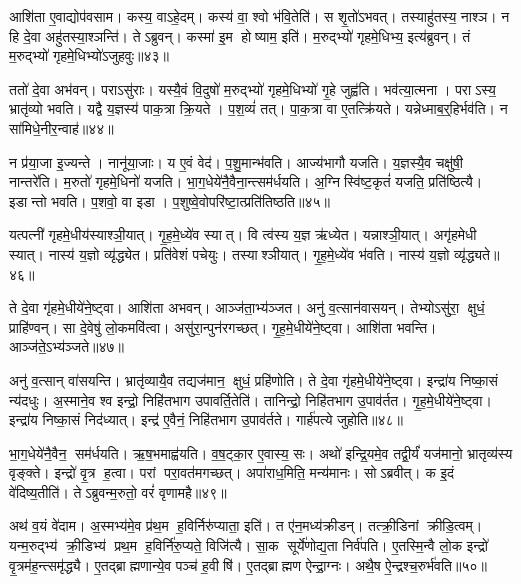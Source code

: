 आशि॑ता ए॒वाद्योप॑वसाम।
कस्य॒ वाऽहे॒दम्।
कस्य॑ वा॒ श्वो भ॑वि॒तेति॑।
स शृ॒तो॑ऽभवत्।
तस्याहु॑तस्य॒ नाश्ञ\sn{}।
न हि दे॒वा अहु॑तस्या॒श्ञन्ति॑।
तेऽब्रुवन्।
कस्मा॑ इ॒म होष्याम॒ इति॑।
म॒रुद्भ्यो॑ गृहमे॒धिभ्य॒ इत्य॑ब्रुवन्।
तं म॒रुद्भ्यो॑ गृहमे॒धिभ्यो॑ऽजुहवुः॥४३॥

ततो॑ दे॒वा अभ॑वन्।
पराऽसु॑राः।
यस्यै॒वं वि॒दुषो॑ म॒रुद्भ्यो॑ गृहमे॒धिभ्यो॑ गृ॒हे जुह्व॑ति।
भव॑त्या॒त्मना।
पराऽस्य॒ भ्रातृ॑व्यो भवति।
यद्वै य॒ज्ञस्य॑ पाक॒त्रा क्रि॒यते।
प॒श॒व्यं॑ तत्।
पा॒क॒त्रा वा ए॒तत्क्रि॑यते।
यन्नेध्माब॒र्॒हिर्भव॑ति।
न सा॑मिधे॒नीर॒न्वाह॑॥४४॥

न प्र॑या॒जा इ॒ज्यन्ते।
नानू॑या॒जाः।
य ए॒वं वेद॑।
प॒शु॒मान्भ॑वति।
आज्य॑भागौ यजति।
य॒ज्ञस्यै॒व चक्षु॑षी॒ नान्तरे॑ति।
म॒रुतो॑ गृहमे॒धिनो॑ यजति।
भा॒ग॒धेये॑नै॒वैना॒न्त्सम॑र्धयति।
अ॒ग्निस्वि॑ष्ट॒कृतं॑ यजति॒ प्रति॑ष्ठित्यै।
इडान्तो भवति।
प॒शवो॒ वा इडा।
प॒शुष्वे॒वोपरि॑ष्टा॒त्प्रति॑तिष्ठति॥४५॥

यत्पत्नी॑ गृहमे॒धीय॑स्याश्ञी॒यात्।
गृ॒ह॒मे॒ध्ये॑व स्यात्।
वि त्व॑स्य य॒ज्ञ ऋ॑ध्येत।
यन्नाश्ञी॒यात्।
अगृ॑हमेधी स्यात्।
नास्य॑ य॒ज्ञो व्यृ॑द्ध्येत।
प्रति॑वेशं पचेयुः।
तस्याश्ञीयात्।
गृ॒ह॒मे॒ध्ये॑व भ॑वति।
नास्य॑ य॒ज्ञो व्यृ॑द्ध्यते॥४६॥

ते दे॒वा गृ॑हमे॒धीये॑ने॒ष्ट्वा।
आशि॑ता अभवन्।
आञ्ज॑ता॒भ्य॑ञ्जत।
अनु॑ व॒त्सान॑वासयन्।
तेभ्योऽसु॑रा॒ क्षुधं॒ प्राहि॑ण्वन्।
सा दे॒वेषु॑ लो॒कमवि॑त्वा।
असु॑रा॒न्पुन॑रगच्छत्।
गृ॒ह॒मे॒धीये॑ने॒ष्ट्वा।
आशि॑ता भवन्ति।
आञ्ज॑ते॒ऽभ्य॑ञ्जते॥४७॥

अनु॑ व॒त्सान् वा॑सयन्ति।
भ्रातृ॑व्यायै॒व तद्यज॑मान॒ क्षुधं॒ प्रहि॑णोति।
ते दे॒वा गृ॑हमे॒धीये॑ने॒ष्ट्वा।
इन्द्रा॑य निष्का॒सं न्य॑दधुः।
अ॒स्माने॒व श्व इन्द्रो॒ निहि॑तभाग उपावर्ति॒तेति॑।
तानिन्द्रो॒ निहि॑तभाग उ॒पाव॑र्तत।
गृ॒ह॒मे॒धीये॑ने॒ष्ट्वा।
इन्द्रा॑य निष्का॒सं निद॑ध्यात्।
इन्द्र॑ ए॒वैनं॒ निहि॑तभाग उ॒पाव॑र्तते।
गार्\mbox{}ह॑पत्ये जुहोति॥४८॥

भा॒ग॒धेये॑नै॒वैन॒ सम॑र्धयति।
ऋ॒ष॒भमाह्व॑यति।
व॒ष॒ट्का॒र ए॒वास्य॒ सः।
अथो॑ इन्द्रि॒यमे॒व तद्वी॒र्यं॑ यज॑मानो॒ भ्रातृव्य॑स्य वृङ्क्ते।
इन्द्रो॑ वृ॒त्र ह॒त्वा।
परां परा॒वत॑मगच्छत्।
अपा॑राध॒मिति॒ मन्य॑मानः।
सोऽब्रवीत्।
क इ॒दं वे॑दिष्य॒तीति॑।
तेऽब्रुवन्म॒रुतो॒ वरं॑ वृणामहै॥४९॥

अथ॑ व॒यं वे॑दाम।
अ॒स्मभ्य॑मे॒व प्र॑थ॒म ह॒विर्निरु॑प्याता॒ इति॑।
त ए॑न॒मध्य॑क्रीडन्।
तत्क्री॒डिनां क्रीडि॒त्वम्।
यन्म॒रुद्भ्य॑ क्री॒डिभ्य॑ प्रथ॒म ह॒विर्नि॑रु॒प्यते॒ विजि॑त्यै।
सा॒क सूर्ये॑णोद्य॒ता निर्व॑पति।
ए॒तस्मि॒न्वै लो॒क इन्द्रो॑ वृ॒त्रम॑ह॒न्त्समृ॑द्ध्यै।
ए॒तद्ब्राह्मणान्ये॒व पञ्च॑ ह॒वीषि॑।
ए॒तद्ब्राह्मण ऐन्द्रा॒ग्नः।
अथै॒ष ऐ॒न्द्रश्च॒रुर्भ॑वति॥५०॥

